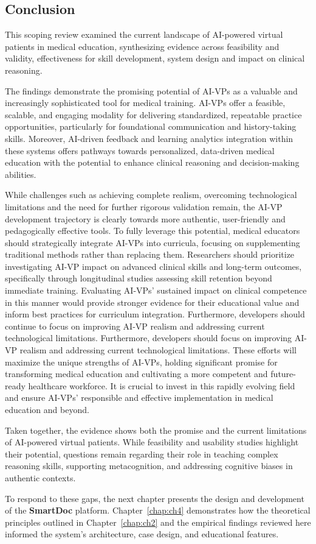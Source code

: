 \subsection*{\textbf{Conclusion}}

This scoping review examined the current landscape of AI-powered virtual patients in medical education, synthesizing evidence across feasibility and validity, effectiveness for skill development, system design and impact on clinical reasoning.

The findings demonstrate the promising potential of AI-VPs as a valuable and increasingly sophisticated tool for medical training. AI-VPs offer a feasible, scalable, and engaging modality for delivering standardized, repeatable practice opportunities, particularly for foundational communication and history-taking skills. Moreover, AI-driven feedback and learning analytics integration within these systems offers pathways towards personalized, data-driven medical education with the potential to enhance clinical reasoning and decision-making abilities.

While challenges such as achieving complete realism, overcoming technological limitations and the need for further rigorous validation remain, the AI-VP development trajectory is clearly towards more authentic, user-friendly and pedagogically effective tools. To fully leverage this potential, medical educators should strategically integrate AI-VPs into curricula, focusing on supplementing traditional methods rather than replacing them. Researchers should prioritize investigating AI-VP impact on advanced clinical skills and long-term outcomes, specifically through longitudinal studies assessing skill retention beyond immediate training. Evaluating AI-VPs’ sustained impact on clinical competence in this manner would provide stronger evidence for their educational value and inform best practices for curriculum integration. Furthermore, developers should continue to focus on improving AI-VP realism and addressing current technological limitations. Furthermore, developers should focus on improving AI-VP realism and addressing current technological limitations. These efforts will maximize the unique strengths of AI-VPs, holding significant promise for transforming medical education and cultivating a more competent and future-ready healthcare workforce. It is crucial to invest in this rapidly evolving field and ensure AI-VPs' responsible and effective implementation in medical education and beyond.

\noindent Taken together, the evidence shows both the promise and the current
limitations of AI-powered virtual patients. While feasibility and usability
studies highlight their potential, questions remain regarding their role in
teaching complex reasoning skills, supporting metacognition, and addressing
cognitive biases in authentic contexts.

To respond to these gaps, the next chapter presents the design and development
of the \textbf{SmartDoc} platform. Chapter~\ref{chap:ch4} demonstrates how the
theoretical principles outlined in Chapter~\ref{chap:ch2} and the empirical
findings reviewed here informed the system’s architecture, case design, and
educational features.

